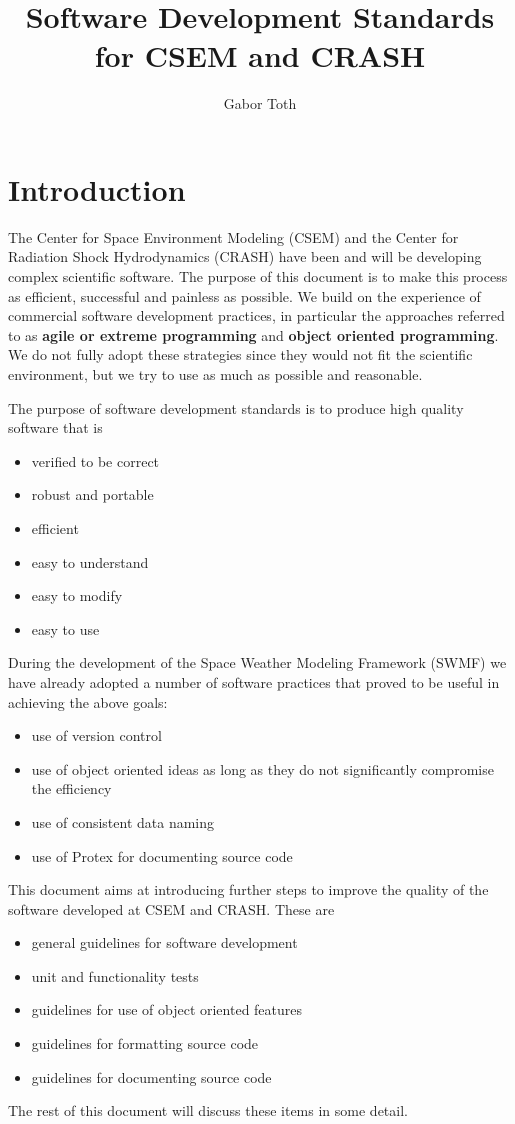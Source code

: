 \documentclass{article}
\title{Software Development Standards for CSEM and CRASH}
\author{Gabor Toth}
\begin{document}
\maketitle

\newpage

\tableofcontents

\newpage

\section{Introduction}

The Center for Space Environment Modeling (CSEM) 
and the Center for Radiation Shock Hydrodynamics (CRASH) have been
and will be developing complex scientific software. 
The purpose of this document is
to make this process as efficient, successful and painless as possible.
We build on the experience of commercial software development practices, 
in particular the approaches referred to as {\bf agile or extreme programming}
and {\bf object oriented programming}. 
We do not fully adopt these strategies since they would not fit the 
scientific environment, but we try to use as much as possible and reasonable. 

The purpose of software development standards is to produce high quality 
software that is
\begin{itemize}
\item verified to be correct
\item robust and portable
\item efficient
\item easy to understand
\item easy to modify
\item easy to use
\end{itemize}
During the development of the Space Weather Modeling Framework (SWMF)
we have already adopted a number of software practices that proved to 
be useful in achieving the above goals:
\begin{itemize}
\item use of version control
\item use of object oriented ideas as long as they do not significantly
      compromise the efficiency 
\item use of consistent data naming
\item use of Protex for documenting source code
\end{itemize}
This document aims at introducing further steps to improve the quality of the
software developed at CSEM and CRASH. These are
\begin{itemize}
\item general guidelines for software development
\item unit and functionality tests
\item guidelines for use of object oriented features
\item guidelines for formatting source code
\item guidelines for documenting source code
\end{itemize}
The rest of this document will discuss these items in some detail.
\end{document}
